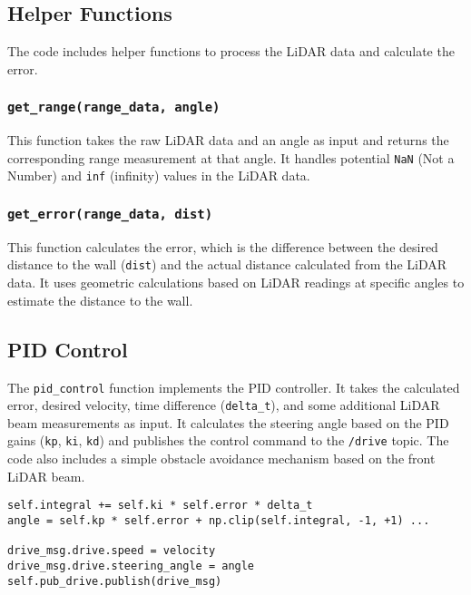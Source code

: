 \subsection{Helper Functions}

The code includes helper functions to process the LiDAR data and calculate the error.

\subsubsection{\texttt{get\_range(range\_data, angle)}}

This function takes the raw LiDAR data and an angle as input and returns the corresponding range measurement at that angle. It handles potential \texttt{NaN} (Not a Number) and \texttt{inf} (infinity) values in the LiDAR data.

\subsubsection{\texttt{get\_error(range\_data, dist)}}

This function calculates the error, which is the difference between the desired distance to the wall (\texttt{dist}) and the actual distance calculated from the LiDAR data.  It uses geometric calculations based on LiDAR readings at specific angles to estimate the distance to the wall.

\subsection{PID Control}

The \texttt{pid\_control} function implements the PID controller.  It takes the calculated error, desired velocity, time difference (\texttt{delta\_t}), and some additional LiDAR beam measurements as input.  It calculates the steering angle based on the PID gains (\texttt{kp}, \texttt{ki}, \texttt{kd}) and publishes the control command to the \texttt{/drive} topic.  The code also includes a simple obstacle avoidance mechanism based on the front LiDAR beam.

\begin{verbatim}
self.integral += self.ki * self.error * delta_t
angle = self.kp * self.error + np.clip(self.integral, -1, +1) ...

drive_msg.drive.speed = velocity
drive_msg.drive.steering_angle = angle
self.pub_drive.publish(drive_msg)
\end{verbatim}

